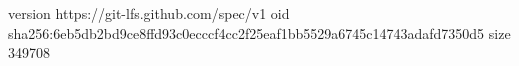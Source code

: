 version https://git-lfs.github.com/spec/v1
oid sha256:6eb5db2bd9ce8ffd93c0ecccf4cc2f25eaf1bb5529a6745c14743adafd7350d5
size 349708
